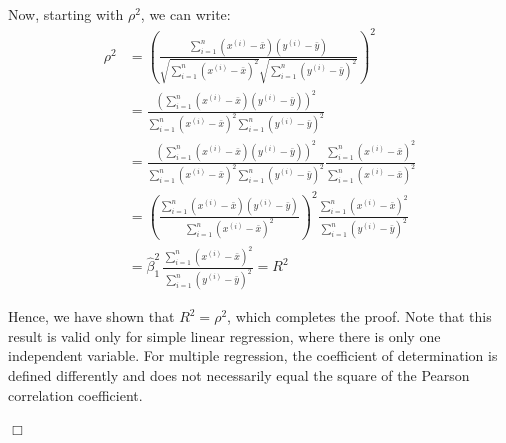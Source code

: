 {Now, starting with $\rho^2$, we can write:
\begin{align*}
	\rho^2 &= \left(\frac{\sum_{i=1}^n (x^{(i)} - \bar{x})(y^{(i)} - \bar{y})}{\sqrt{\sum_{i=1}^n (x^{(i)} - \bar{x})^2}\sqrt{\sum_{i=1}^n (y^{(i)} - \bar{y})^2}}\right)^2 \\
	&= \frac{\left(\sum_{i=1}^n (x^{(i)} - \bar{x})(y^{(i)} - \bar{y})\right)^2}{\sum_{i=1}^n (x^{(i)} - \bar{x})^2\sum_{i=1}^n (y^{(i)} - \bar{y})^2}\\
	&= \frac{\left(\sum_{i=1}^n (x^{(i)} - \bar{x})(y^{(i)} - \bar{y})\right)^2}{\sum_{i=1}^n (x^{(i)} - \bar{x})^2\sum_{i=1}^n (y^{(i)} - \bar{y})^2} \frac{\sum_{i=1}^n (x^{(i)} - \bar{x})^2}{\sum_{i=1}^n (x^{(i)} - \bar{x})^2}\\
	&= \left(\frac{\sum_{i=1}^n (x^{(i)} - \bar{x})(y^{(i)} - \bar{y})}{\sum_{i=1}^n (x^{(i)} - \bar{x})^2}\right)^2 \frac{\sum_{i=1}^n (x^{(i)} - \bar{x})^2}{\sum_{i=1}^n (y^{(i)} - \bar{y})^2} \\
	&= \hat{\beta}_1^2 \, \frac{\sum_{i=1}^n (x^{(i)} - \bar{x})^2}{\sum_{i=1}^n (y^{(i)} - \bar{y})^2}
	= R^2
\end{align*}

%
%

Hence, we have shown that $R^2 = \rho^2$, which completes the proof. Note that this result is valid only for simple linear regression, where there is only one independent variable. For multiple regression, the coefficient of determination is defined differently and does not necessarily equal the square of the Pearson correlation coefficient.

\hfill $\Box$ \\
\vspace*{-0.3cm}
}
